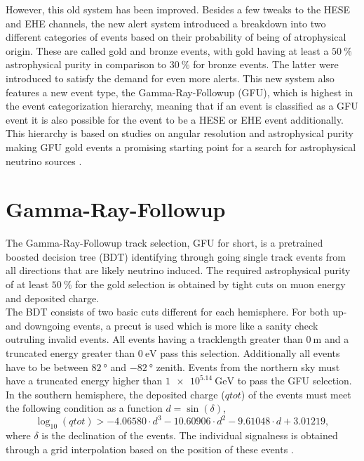 However, this old system has been improved.
Besides a few tweaks to the HESE and EHE channels, the new alert system introduced a breakdown into two different categories of events based on their probability of being of atrophysical origin.
These are called gold and bronze events, with gold having at least a $\SI{50}{\percent}$ astrophysical purity in comparison to $\SI{30}{\percent}$ for bronze events.
The latter were introduced to satisfy the demand for even more alerts.
This new system also features a new event type, the Gamma-Ray-Followup (GFU), which is highest in the event categorization hierarchy, meaning that if an event is classified as a GFU event it is also possible for the event to be a HESE or EHE event additionally.
This hierarchy is based on studies on angular resolution and astrophysical purity making GFU gold events a promising starting point for a search for astrophysical neutrino sources \cite{Aartsen_2017}.

\section{Gamma-Ray-Followup}

The Gamma-Ray-Followup track selection, GFU for short, is a pretrained boosted decision tree (BDT) identifying through going single track events from all directions that are likely neutrino induced.
The required astrophysical purity of at least $\SI{50}{\percent}$ for the gold selection is obtained by tight cuts on muon energy and deposited charge.\\
The BDT consists of two basic cuts different for each hemisphere.
For both up- and downgoing events, a precut is used which is more like a sanity check outruling invalid events.
All events having a tracklength greater than $\SI{0}{\meter}$ and a truncated energy greater than $\SI{0}{\electronvolt}$ pass this selection.
Additionally all events have to be between $\SI{82}{\degree}$ and $\SI{-82}{\degree}$ zenith.
Events from the northern sky must have a truncated energy higher than $\SI{1e5.14}{\giga\electronvolt}$ to pass the GFU selection.
In the southern hemisphere, the deposited charge ($qtot$) of the events must meet the following condition as a function $d=\sin{(\delta)}$,
\begin{equation}
  \log_{10}(qtot) > -4.06580\cdot d^3 - 10.60906\cdot d^2  -9.61048\cdot d + 3.01219,
\end{equation}
where $\delta$ is the declination of the events.
The individual signalness is obtained through a grid interpolation based on the position of these events \cite{track_alert_paper}.

